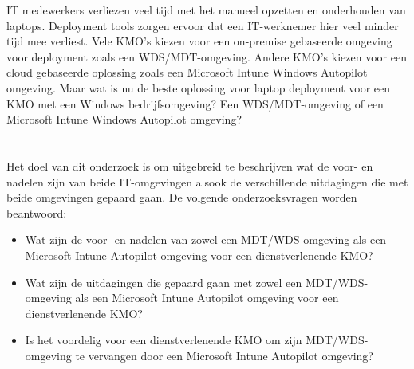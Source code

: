 IT medewerkers verliezen veel tijd met het manueel opzetten en onderhouden van laptops.
Deployment tools zorgen ervoor dat een IT-werknemer hier veel minder tijd mee verliest. Vele KMO's kiezen voor een on-premise gebaseerde omgeving voor deployment zoals een WDS/MDT-omgeving. Andere KMO's kiezen voor een cloud gebaseerde oplossing zoals een Microsoft Intune Windows Autopilot omgeving. Maar wat is nu de beste oplossing voor laptop deployment voor een KMO met een Windows bedrijfsomgeving? Een WDS/MDT-omgeving of een Microsoft Intune Windows Autopilot omgeving?


\section{}
\label{sec:onderzoeksvraag}
Het doel van dit onderzoek is om uitgebreid te beschrijven wat de voor- en nadelen zijn van beide IT-omgevingen alsook de verschillende uitdagingen die met beide omgevingen gepaard gaan. De volgende onderzoeksvragen worden beantwoord:

\begin{itemize}
    \item Wat zijn de voor- en nadelen van zowel een MDT/WDS-omgeving als een Microsoft Intune Autopilot omgeving voor een dienstverlenende KMO?
    \item Wat zijn de uitdagingen die gepaard gaan met zowel een MDT/WDS-omgeving als een Microsoft Intune Autopilot omgeving voor een dienstverlenende KMO?
    \item Is het voordelig voor een dienstverlenende KMO om zijn MDT/WDS-omgeving te vervangen door een Microsoft Intune Autopilot omgeving?
\end{itemize}


\section{}
\label{sec:onderzoeksdoelstelling}

